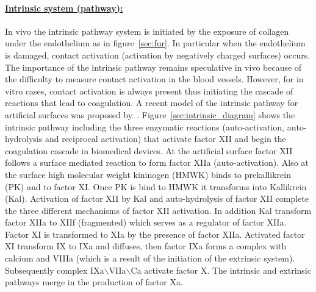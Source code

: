\documentclass[%
 nofootinbib,
 amsmath,amssymb,
 aps,
 pra,
]{revtex4-1}
\begin{document}
\paragraph{\underline{Intrinsic system (pathway):}}
In vivo the intrinsic pathway system is initiated by the exposure of collagen under the endothelium as in figure~\ref{sec:fur}. In particular when the endothelium is damaged, contact activation (activation by negatively charged surfaces) occurs. The importance of the intrinsic pathway remains speculative in vivo because of the difficulty to measure contact activation in the blood vessels. However, for in vitro cases, contact activation is always present thus initiating the cascade of reactions that lead to coagulation. A recent model of the intrinsic pathway for artificial surfaces was proposed by~\citet{Chatterjee:2009a}. Figure~\ref{sec:intrinsic_diagram} shows the intrinsic pathway including the three enzymatic reactions (auto-activation, auto-hydrolysis and reciprocal activation) that activate factor XII and begin the coagulation cascade in biomedical devices. At the artificial surface factor XII follows a surface mediated reaction to form factor XIIa (auto-activation). Also at the surface %
high molecular weight kininogen (HMWK) binds to prekallikrein %
 (PK) and to factor XI. Once PK is bind to HMWK it transforms into %
Kallikrein (Kal). Activation of factor XII by Kal and auto-hydrolysis of factor XII complete the three different mechanisms of factor XII activation. In addition Kal transform factor XIIa to XIIf (fragmented) which serves as a regulator of factor XIIa.\\
Factor XI is transformed to XIa by the presence of factor XIIa. Activated factor XI transform IX to IXa and diffuses, then factor IXa forms a complex with calcium and VIIIa (which is a result of the initiation of the extrinsic system). Subsequently complex IXa$\backslash$VIIa$\backslash$Ca activate factor X. The intrinsic and extrinsic pathways merge in the production of factor Xa. \\
\end{document}
